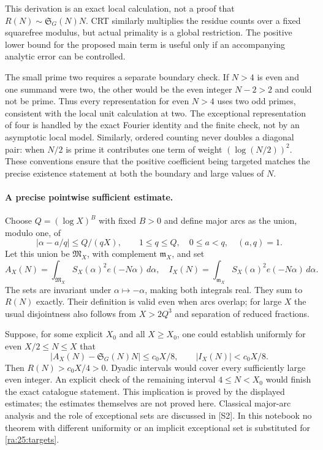 \documentclass[11pt]{article}
\begin{document}
This derivation is an exact local calculation, not a proof that
$R(N)\sim\mathfrak S_G(N)N$. CRT similarly multiplies the residue counts
over a fixed squarefree modulus, but actual primality is a global
restriction. The positive lower bound for the proposed main term is
useful only if an accompanying analytic error can be controlled.

The small prime two requires a separate boundary check. If $N>4$ is
even and one summand were two, the other would be the even integer
$N-2>2$ and could not be prime. Thus every representation for even
$N>4$ uses two odd primes, consistent with the local unit calculation
at two. The exceptional representation of four is handled by the exact
Fourier identity and the finite check, not by an asymptotic local model.
Similarly, ordered counting never doubles a diagonal pair: when $N/2$
is prime it contributes one term of weight $(\log(N/2))^2$.
These conventions ensure that the positive coefficient being targeted
matches the precise existence statement at both the boundary and large
values of $N$.

\paragraph{A precise pointwise sufficient estimate.}
Choose $Q=(\log X)^B$ with fixed $B>0$ and define major arcs as the
union, modulo one, of
\[
 |\alpha-a/q|\le Q/(qX),\qquad
 1\le q\le Q,\quad 0\le a<q,\quad(a,q)=1.
\]
Let this union be $\mathfrak M_X$, with complement $\mathfrak m_X$,
and set
\[
 A_X(N)=\int_{\mathfrak M_X}S_X(\alpha)^2e(-N\alpha)\,d\alpha,
 \quad I_X(N)=\int_{\mathfrak m_X}S_X(\alpha)^2e(-N\alpha)\,d\alpha.
\]
The sets are invariant under $\alpha\mapsto-\alpha$, making both
integrals real. They sum to $R(N)$ exactly. Their definition is valid
even when arcs overlap; for large $X$ the usual disjointness also follows
from $X>2Q^3$ and separation of reduced fractions.

Suppose, for some explicit $X_0$ and all $X\ge X_0$, one could establish
uniformly for even $X/2\le N\le X$ that
\begin{equation}\label{ra:25:targets}
 |A_X(N)-\mathfrak S_G(N)N|\le c_0X/8,
 \qquad |I_X(N)|<c_0X/8.
\end{equation}
Then $R(N)>c_0X/4>0$. Dyadic intervals would cover every sufficiently
large even integer. An explicit check of the remaining interval
$4\le N<X_0$ would finish the exact catalogue statement. This implication
is proved by the displayed estimates; the estimates themselves are not
proved here. Classical major-arc analysis and the role of exceptional
sets are discussed in [S2]. In this notebook no theorem with different
uniformity or an implicit exceptional set is substituted for
\eqref{ra:25:targets}.
\end{document}
